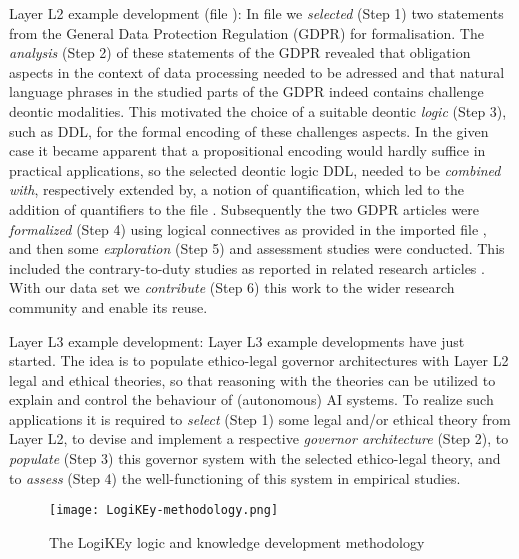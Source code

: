 \documentclass{article}
\begin{document}
\begin{description}
\item{Layer L2 example development (file \textsf{\small
      }):} In file \textsf{\small
    } we \textit{selected} (Step 1) two
  statements from the General Data Protection Regulation (GDPR) for
  formalisation. The \textit{analysis} (Step 2) of these statements of
  the GDPR revealed that obligation aspects in the context of data
  processing needed to be adressed and that natural language phrases
  in the studied parts of the GDPR indeed contains challenge deontic
  modalities. This motivated the choice of a suitable deontic
  \textit{logic} (Step 3), such as DDL, for the formal encoding of
  these challenges aspects. In the given case it became apparent that
  a propositional encoding would hardly suffice in practical applications, so the selected
  deontic logic DDL, needed to be \textit{combined with}, respectively
  extended by, a notion of quantification, which led to the addition of
  quantifiers to the file \textsf{\small
    }. Subsequently the two GDPR articles were
  \textit{formalized} (Step 4) using logical connectives as provided in the imported file \textsf{\small
    }, and then some \textit{exploration} (Step 5)
  and assessment studies were conducted. This included the
  contrary-to-duty studies as reported in related research articles
  \cite{J48,C71}. With our data set we \textit{contribute} (Step 6)
  this work to the wider research community and enable its reuse. 

\item{Layer L3 example development:}  Layer L3 example developments
  have just started. The idea is to populate ethico-legal governor
  architectures \cite{J48}
  with Layer L2 legal and ethical theories, so that reasoning with the
  theories can be utilized to explain and control the behaviour of
  (autonomous) AI systems. To realize such applications it is required
  to \textit{select} (Step 1) some legal and/or ethical theory from
  Layer L2, to
  devise and implement a respective \textit{governor architecture}
  (Step 2), to \textit{populate} (Step 3) this governor system with
  the selected ethico-legal theory, and to \textit{assess} (Step 4) the
  well-functioning of this system in empirical studies.
\end{description} 


\begin{figure}[ht!]
 \texttt{[image: LogiKEy-methodology.png]}
\caption{The LogiKEy logic and knowledge development methodology \label{fig:LogiKEy}}
\end{figure}
\end{document}
